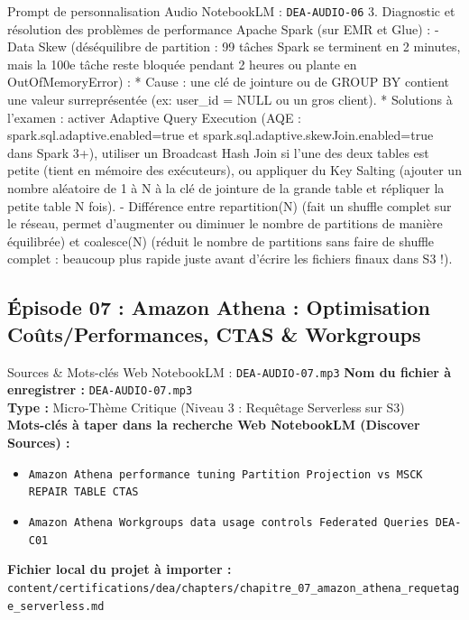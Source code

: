 \documentclass[11pt,a4paper]{article}
\begin{document}
\begin{promptbox}{Prompt de personnalisation Audio NotebookLM : \texttt{DEA-AUDIO-06}}
3. Diagnostic et résolution des problèmes de performance Apache Spark (sur EMR et Glue) :
- Data Skew (déséquilibre de partition : 99 tâches Spark se terminent en 2 minutes, mais la 100e tâche reste bloquée pendant 2 heures ou plante en OutOfMemoryError) :
  * Cause : une clé de jointure ou de GROUP BY contient une valeur surreprésentée (ex: user\_id = NULL ou un gros client).
  * Solutions à l'examen : activer Adaptive Query Execution (AQE : spark.sql.adaptive.enabled=true et spark.sql.adaptive.skewJoin.enabled=true dans Spark 3+), utiliser un Broadcast Hash Join si l'une des deux tables est petite (tient en mémoire des exécuteurs), ou appliquer du Key Salting (ajouter un nombre aléatoire de 1 à N à la clé de jointure de la grande table et répliquer la petite table N fois).
- Différence entre repartition(N) (fait un shuffle complet sur le réseau, permet d'augmenter ou diminuer le nombre de partitions de manière équilibrée) et coalesce(N) (réduit le nombre de partitions sans faire de shuffle complet : beaucoup plus rapide juste avant d'écrire les fichiers finaux dans S3 !).
\end{promptbox}

\subsection{Épisode 07 : Amazon Athena : Optimisation Coûts/Performances, CTAS \& Workgroups}
\begin{sourcebox}{Sources \& Mots-clés Web NotebookLM : \texttt{DEA-AUDIO-07.mp3}}
\textbf{Nom du fichier à enregistrer :} \texttt{DEA-AUDIO-07.mp3}\\
\textbf{Type :} Micro-Thème Critique (Niveau 3 : Requêtage Serverless sur S3)\\
\textbf{Mots-clés à taper dans la recherche Web NotebookLM (Discover Sources) :}
\begin{itemize}[noitemsep]
    \item \texttt{Amazon Athena performance tuning Partition Projection vs MSCK REPAIR TABLE CTAS}
    \item \texttt{Amazon Athena Workgroups data usage controls Federated Queries DEA-C01}
\end{itemize}
\textbf{Fichier local du projet à importer :}
\texttt{content/certifications/dea/chapters/chapitre_07_amazon_athena_requetage_serverless.md}
\end{sourcebox}
\end{document}
